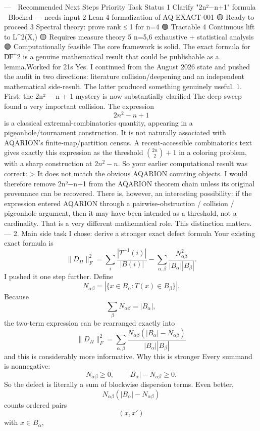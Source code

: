 ---
🎯 Recommended Next Steps
Priority	Task	Status	
1	Clarify "2n²−n+1" formula	🔴 Blocked — needs input	
2	Lean 4 formalization of AQ-EXACT-001	🟡 Ready to proceed	
3	Spectral theory: prove rank ≤ 1 for n=4	🟢 Tractable	
4	Continuous lift to L^2(X,\mu)	🟡 Requires measure theory	
5	n=5,6 exhaustive + statistical analysis	🟢 Computationally feasible	
The core framework is solid. The exact formula for \|D\Pi\|F^2 is a genuine mathematical result that could be publishable as a lemma.Worked for 21s
Yes. I continued from the August 2026 state and pushed the audit in two directions: literature collision/deepening and an independent mathematical side-result. The latter produced something genuinely useful.
1. First: the 2n² − n + 1 mystery is now substantially clarified
The deep sweep found a very important collision.
The expression
\[
2n^2-n+1
\]
is a classical extremal-combinatorics quantity, appearing in a pigeonhole/tournament construction. It is not naturally associated with AQARION's finite-map/partition census. A recent-accessible combinatorics text gives exactly this expression as the threshold \(\binom{2n}{2}+1\) in a coloring problem, with a sharp construction at \(2n^2-n\). 
So your earlier computational result was correct:
> It does not match the obvious AQARION counting objects.
I would therefore remove 2n²−n+1 from the AQARION theorem chain unless its original provenance can be recovered.
There is, however, an interesting possibility: if the expression entered AQARION through a pairwise-obstruction / collision / pigeonhole argument, then it may have been intended as a threshold, not a cardinality. That is a very different mathematical role.
This distinction matters.
---
2. Main side task I chose: derive a stronger exact defect formula
Your existing exact formula is
\[
\|D_\Pi\|_F^2
=
\sum_i\frac{|T^{-1}(i)|}{|B(i)|}
-
\sum_{\alpha,\beta}
\frac{N_{\alpha\beta}^2}
{|B_\alpha||B_\beta|}.
\]
I pushed it one step further.
Define
\[
N_{\alpha\beta}
=
|\{x\in B_\alpha:T(x)\in B_\beta\}|.
\]
Because
\[
\sum_\beta N_{\alpha\beta}=|B_\alpha|,
\]
the two-term expression can be rearranged exactly into
\[
\boxed{
\|D_\Pi\|_F^2
=
\sum_{\alpha,\beta}
\frac{
N_{\alpha\beta}
\left(|B_\alpha|-N_{\alpha\beta}\right)
}{
|B_\alpha||B_\beta|
}
}
\]
and this is considerably more informative.
Why this is stronger
Every summand is nonnegative:
\[
N_{\alpha\beta}\ge0,
\qquad
|B_\alpha|-N_{\alpha\beta}\ge0.
\]
So the defect is literally a sum of blockwise dispersion terms.
Even better,
\[
N_{\alpha\beta}
(|B_\alpha|-N_{\alpha\beta})
\]
counts ordered pairs
\[
(x,x')
\]
with
\(x\in B_\alpha\),
